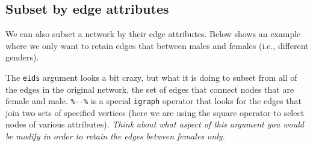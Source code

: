 \documentclass[
]{book}
\newenvironment{Shaded}{\begin{snugshade}}{\end{snugshade}}
\newcommand{\AttributeTok}[1]{\textcolor[rgb]{0.13,0.29,0.53}{#1}}
\newcommand{\CommentTok}[1]{\textcolor[rgb]{0.56,0.35,0.01}{\textit{#1}}}
\newcommand{\FunctionTok}[1]{\textcolor[rgb]{0.13,0.29,0.53}{\textbf{#1}}}
\newcommand{\NormalTok}[1]{#1}
\newcommand{\OtherTok}[1]{\textcolor[rgb]{0.56,0.35,0.01}{#1}}
\newcommand{\SpecialCharTok}[1]{\textcolor[rgb]{0.81,0.36,0.00}{\textbf{#1}}}
\newcommand{\StringTok}[1]{\textcolor[rgb]{0.31,0.60,0.02}{#1}}
\begin{document}
\subsection{Subset by edge attributes}\label{subset-by-edge-attributes}

We can also subset a network by their edge attributes. Below shows an example where we only want to retain edges that between males and females (i.e., different genders).

The \texttt{eids} argument looks a bit crazy, but what it is doing to subset from all of the edges in the original network, the set of edges that connect nodes that are female and male. \texttt{\%-\/-\%} is a special \texttt{igraph} operator that looks for the edges that join two sets of specified vertices (here we are using the square operator to select nodes of various attributes). \emph{Think about what aspect of this argument you would be modify in order to retain the edges between females only.}

\begin{Shaded}
\end{Shaded}
\end{document}

